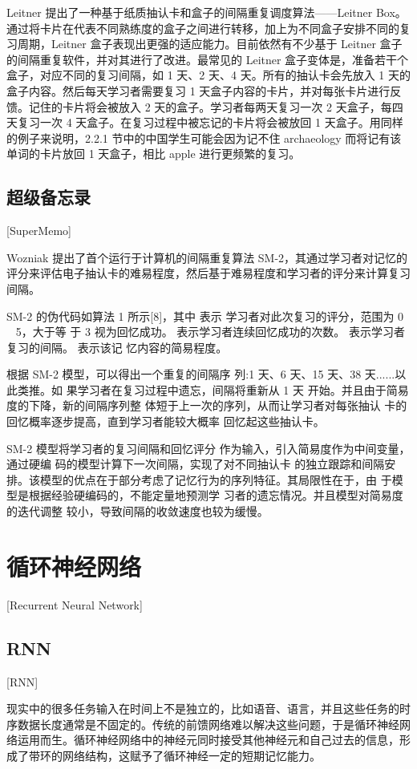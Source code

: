 Leitner 提出了一种基于纸质抽认卡和盒子的间隔重复调度算法——Leitner Box。通过将卡片在代表不同熟练度的盒子之间进行转移，加上为不同盒子安排不同的复习周期，Leitner 盒子表现出更强的适应能力。目前依然有不少基于 Leitner 盒子的间隔重复软件，并对其进行了改进。最常见的 Leitner 盒子变体是，准备若干个盒子，对应不同的复习间隔，如 1 天、2 天、4 天。所有的抽认卡会先放入 1 天的盒子内容。然后每天学习者需要复习 1 天盒子内容的卡片，并对每张卡片进行反馈。记住的卡片将会被放入 2 天的盒子。学习者每两天复习一次 2 天盒子，每四天复习一次 4 天盒子。在复习过程中被忘记的卡片将会被放回 1 天盒子。用同样的例子来说明，2.2.1 节中的中国学生可能会因为记不住 archaeology 而将记有该单词的卡片放回 1 天盒子，相比 apple 进行更频繁的复习。

\subsection{超级备忘录}[SuperMemo]

Wozniak 提出了首个运行于计算机的间隔重复算法 SM-2，其通过学习者对记忆的评分来评估电子抽认卡的难易程度，然后基于难易程度和学习者的评分来计算复习间隔。

SM-2 的伪代码如算法 1 所示[8]，其中 表示 学习者对此次复习的评分，范围为 0 ~ 5，大于等 于 3 视为回忆成功。 表示学习者连续回忆成功的次数。 表示学习者复习的间隔。 表示该记 忆内容的简易程度。

根据 SM-2 模型，可以得出一个重复的间隔序 列:1 天、6 天、15 天、38 天......以此类推。如 果学习者在复习过程中遗忘，间隔将重新从 1 天 开始。并且由于简易度的下降，新的间隔序列整 体短于上一次的序列，从而让学习者对每张抽认 卡的回忆概率逐步提高，直到学习者能较大概率 回忆起这些抽认卡。

SM-2 模型将学习者的复习间隔和回忆评分 作为输入，引入简易度作为中间变量，通过硬编 码的模型计算下一次间隔，实现了对不同抽认卡 的独立跟踪和间隔安排。该模型的优点在于部分考虑了记忆行为的序列特征。其局限性在于，由 于模型是根据经验硬编码的，不能定量地预测学 习者的遗忘情况。并且模型对简易度的迭代调整 较小，导致间隔的收敛速度也较为缓慢。

\section{循环神经网络}[Recurrent Neural Network]

\subsection{RNN}[RNN]

现实中的很多任务输入在时间上不是独立的，比如语音、语言，并且这些任务的时序数据长度通常是不固定的。传统的前馈网络难以解决这些问题，于是循环神经网络运用而生。循环神经网络中的神经元同时接受其他神经元和自己过去的信息，形成了带环的网络结构，这赋予了循环神经一定的短期记忆能力。


